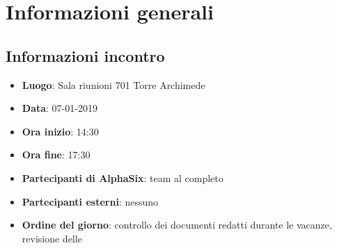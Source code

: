 \newcommand{\documento}{\VI}
\newcommand{\nomedocumentofisico}{VI\_07-01-2018.pdf}
\newcommand{\redazione}{\SG}
\newcommand{\verifica}{\LC}
\newcommand{\approvazione}{\NC}
\newcommand{\versione}{1.0.0}
\newcommand{\uso}{Interno}
\newcommand{\destinateTo}{\TV, \\ & \RC, \\ & \II}
\newcommand{\datacreazione}{08 gennaio 2019}
\newcommand{\datamodifica}{09 gennaio 2019}
\newcommand{\stato}{Approvato}

\def\TABELLE{false}	%
\def\FIGURE{false} 	%






    

    	
    
    \section{Informazioni generali}
		\subsection{Informazioni incontro}
			\begin{itemize}
				\item { \textbf{Luogo}: Sala riunioni 701 Torre Archimede}
				\item { \textbf{Data}: 07-01-2019}
				\item { \textbf{Ora inizio}: 14:30}
				\item { \textbf{Ora fine}: 17:30}
				\item { \textbf{Partecipanti di AlphaSix}: team al completo}
				\item { \textbf{Partecipanti esterni}: nessuno}
				\item { \textbf{Ordine del giorno}: controllo dei documenti redatti durante le vacanze, revisione delle \NdP}
			\end{itemize}

